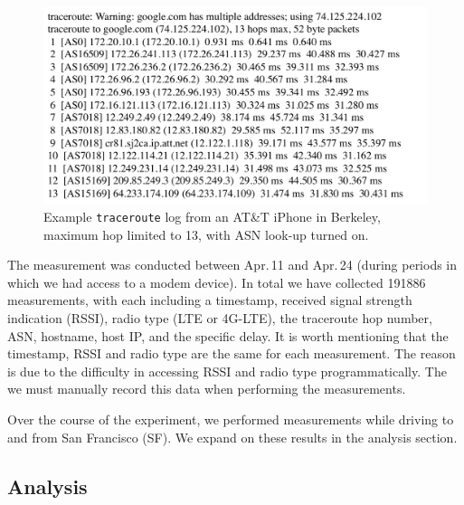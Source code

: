 \begin{figure}[!htb]
  \centering
  \includegraphics[width=1.1\linewidth]{../figs/traceroute.pdf}
  \vspace{-1em}
  \caption{Example \texttt{traceroute} log from an AT\&T iPhone in Berkeley, maximum hop limited to 13, with ASN look-up turned on.}
  \label{fig:traceroute}
\end{figure}


The measurement was conducted between Apr.\,11 and Apr.\,24 (during periods in which we had access to a modem device). In total we have collected 191886 measurements, with each including a timestamp, received signal strength indication (RSSI), radio type (LTE or 4G-LTE), the traceroute hop number, ASN, hostname, host IP, and the specific delay. It is worth mentioning that the timestamp, RSSI and radio type are the same for each measurement. The reason is due to the difficulty in accessing RSSI and radio type programmatically. The we must manually record this data when performing the measurements.

Over the course of the experiment, we performed measurements while driving to and from San Francisco (SF). We expand on these results in the analysis section. 

\subsection{Analysis}
\label{sec:analysis}

